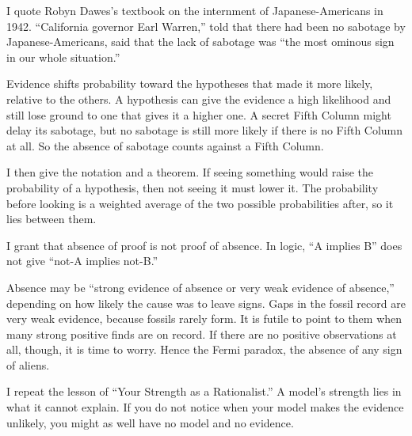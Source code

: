 
I quote Robyn Dawes's textbook on the internment of Japanese-Americans in 1942. ``California governor Earl Warren,'' told that there had been no sabotage by Japanese-Americans, said that the lack of sabotage was ``the most ominous sign in our whole situation.'' 

Evidence shifts probability toward the hypotheses that made it more likely, relative to the others. A hypothesis can give the evidence a high likelihood and still lose ground to one that gives it a higher one. A secret Fifth Column might delay its sabotage, but no sabotage is still more likely if there is no Fifth Column at all. So the absence of sabotage counts against a Fifth Column. 

I then give the notation and a theorem. If seeing something would raise the probability of a hypothesis, then not seeing it must lower it. The probability before looking is a weighted average of the two possible probabilities after, so it lies between them.

I grant that absence of proof is not proof of absence. In logic, ``A implies B'' does not give ``not-A implies not-B.'' 

Absence may be ``strong evidence of absence or very weak evidence of absence,'' depending on how likely the cause was to leave signs. Gaps in the fossil record are very weak evidence, because fossils rarely form. It is futile to point to them when many strong positive finds are on record. If there are no positive observations at all, though, it is time to worry. Hence the Fermi paradox, the absence of any sign of aliens. 

I repeat the lesson of ``Your Strength as a Rationalist.'' A model's strength lies in what it cannot explain. If you do not notice when your model makes the evidence unlikely, you might as well have no model and no evidence.

